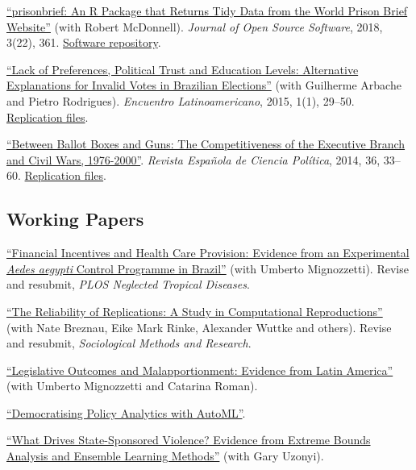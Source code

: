 \documentclass[a4paper]{article}
\renewenvironment{itemize}{
	\begin{list}{}{
			\setlength{\leftmargin}{1.5em}
		}
		}{
	\end{list}
}
\begin{document}
\begin{itemize}
\item \href{https://doi.org/10.21105/joss.00361}{``prisonbrief: An R Package that Returns Tidy Data from the World Prison Brief Website''} (with Robert McDonnell). \textit{Journal of Open Source Software}, 2018, 3(22), 361. \href{https://github.com/danilofreire/prisonbrief}{Software repository}.
\item \href{http://www.iapss.org/wp-content/uploads/2014/10/ELA1.1_2.Lack-of-Preferences-Political-Trust-and-Education-Levels.pdf}{``Lack of Preferences, Political Trust and Education Levels: Alternative Explanations for Invalid Votes in Brazilian Elections''} (with Guilherme Arbache and Pietro Rodrigues). \textit{Encuentro Latinoamericano}, 2015, 1(1), 29--50. \href{https://github.com/danilofreire/invalid-votes-brazil}{Replication files}.
\item \href{http://recyt.fecyt.es/index.php/recp/article/view/37638}{``Between Ballot Boxes and Guns: The Competitiveness of the Executive Branch and Civil Wars, 1976-2000''}. \textit{Revista Española de Ciencia Política}, 2014, 36, 33--60. \href{https://doi.org/10.7910/DVN/NSDUYG}{Replication files}.
\end{itemize}

\subsection*{Working Papers}

\begin{itemize}
\item \href{https://github.com/danilofreire/incentives-healthcare}{``Financial Incentives and Health Care Provision: Evidence from an Experimental \textit{Aedes aegypti} Control Programme in Brazil''} (with Umberto Mignozzetti). Revise and resubmit, \textit{PLOS Neglected Tropical Diseases}.
\item \href{https://osf.io/preprints/socarxiv/j7qta}{``The Reliability of Replications: A Study in Computational
Reproductions''} (with Nate Breznau, Eike Mark Rinke, Alexander Wuttke and others). Revise and resubmit, \textit{Sociological Methods and Research}. 
\item \href{https://github.com/danilofreire/danilofreire.github.io/blob/master/malapportionment.pdf}{``Legislative Outcomes and Malapportionment: Evidence from Latin America''} (with Umberto Mignozzetti and Catarina Roman).
\item \href{https://github.com/danilofreire/mercatus-analytics-papers/blob/main/automl-paper/automl.pdf}{``Democratising Policy Analytics with AutoML''}. 
\item \href{https://osf.io/pzx3q}{``What Drives State-Sponsored Violence? Evidence from Extreme Bounds Analysis and Ensemble Learning Methods''} (with Gary Uzonyi).
\end{itemize}
\end{document}
